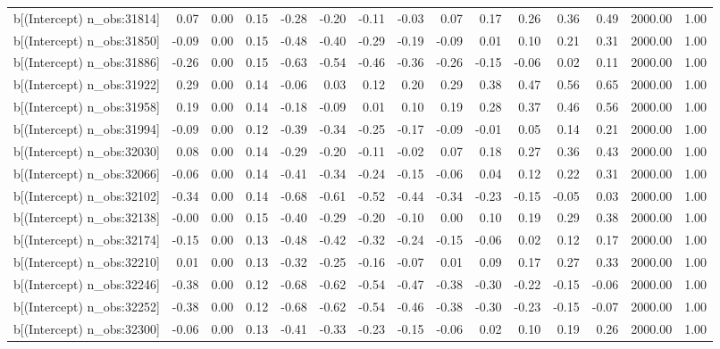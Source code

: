 \begin{table}[ht]
\begin{tabular}{rrrrrrrrrrrrrrr}
  b[(Intercept) n\_obs:31814] & 0.07 & 0.00 & 0.15 & -0.28 & -0.20 & -0.11 & -0.03 & 0.07 & 0.17 & 0.26 & 0.36 & 0.49 & 2000.00 & 1.00 \\ 
  b[(Intercept) n\_obs:31850] & -0.09 & 0.00 & 0.15 & -0.48 & -0.40 & -0.29 & -0.19 & -0.09 & 0.01 & 0.10 & 0.21 & 0.31 & 2000.00 & 1.00 \\ 
  b[(Intercept) n\_obs:31886] & -0.26 & 0.00 & 0.15 & -0.63 & -0.54 & -0.46 & -0.36 & -0.26 & -0.15 & -0.06 & 0.02 & 0.11 & 2000.00 & 1.00 \\ 
  b[(Intercept) n\_obs:31922] & 0.29 & 0.00 & 0.14 & -0.06 & 0.03 & 0.12 & 0.20 & 0.29 & 0.38 & 0.47 & 0.56 & 0.65 & 2000.00 & 1.00 \\ 
  b[(Intercept) n\_obs:31958] & 0.19 & 0.00 & 0.14 & -0.18 & -0.09 & 0.01 & 0.10 & 0.19 & 0.28 & 0.37 & 0.46 & 0.56 & 2000.00 & 1.00 \\ 
  b[(Intercept) n\_obs:31994] & -0.09 & 0.00 & 0.12 & -0.39 & -0.34 & -0.25 & -0.17 & -0.09 & -0.01 & 0.05 & 0.14 & 0.21 & 2000.00 & 1.00 \\ 
  b[(Intercept) n\_obs:32030] & 0.08 & 0.00 & 0.14 & -0.29 & -0.20 & -0.11 & -0.02 & 0.07 & 0.18 & 0.27 & 0.36 & 0.43 & 2000.00 & 1.00 \\ 
  b[(Intercept) n\_obs:32066] & -0.06 & 0.00 & 0.14 & -0.41 & -0.34 & -0.24 & -0.15 & -0.06 & 0.04 & 0.12 & 0.22 & 0.31 & 2000.00 & 1.00 \\ 
  b[(Intercept) n\_obs:32102] & -0.34 & 0.00 & 0.14 & -0.68 & -0.61 & -0.52 & -0.44 & -0.34 & -0.23 & -0.15 & -0.05 & 0.03 & 2000.00 & 1.00 \\ 
  b[(Intercept) n\_obs:32138] & -0.00 & 0.00 & 0.15 & -0.40 & -0.29 & -0.20 & -0.10 & 0.00 & 0.10 & 0.19 & 0.29 & 0.38 & 2000.00 & 1.00 \\ 
  b[(Intercept) n\_obs:32174] & -0.15 & 0.00 & 0.13 & -0.48 & -0.42 & -0.32 & -0.24 & -0.15 & -0.06 & 0.02 & 0.12 & 0.17 & 2000.00 & 1.00 \\ 
  b[(Intercept) n\_obs:32210] & 0.01 & 0.00 & 0.13 & -0.32 & -0.25 & -0.16 & -0.07 & 0.01 & 0.09 & 0.17 & 0.27 & 0.33 & 2000.00 & 1.00 \\ 
  b[(Intercept) n\_obs:32246] & -0.38 & 0.00 & 0.12 & -0.68 & -0.62 & -0.54 & -0.47 & -0.38 & -0.30 & -0.22 & -0.15 & -0.06 & 2000.00 & 1.00 \\ 
  b[(Intercept) n\_obs:32252] & -0.38 & 0.00 & 0.12 & -0.68 & -0.62 & -0.54 & -0.46 & -0.38 & -0.30 & -0.23 & -0.15 & -0.07 & 2000.00 & 1.00 \\ 
  b[(Intercept) n\_obs:32300] & -0.06 & 0.00 & 0.13 & -0.41 & -0.33 & -0.23 & -0.15 & -0.06 & 0.02 & 0.10 & 0.19 & 0.26 & 2000.00 & 1.00 \\ 

\end{tabular}
\end{table}
